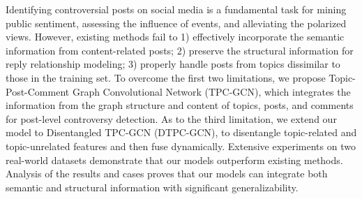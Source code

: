 Identifying controversial posts on social media is a fundamental task for mining public sentiment, assessing the influence of events, and alleviating the polarized views. However, existing methods fail to 1) effectively incorporate the semantic information from content-related posts; 2) preserve the structural information for reply relationship modeling; 3) properly handle posts from topics dissimilar to those in the training set. To overcome the first two limitations, we propose Topic-Post-Comment Graph Convolutional Network (TPC-GCN), which integrates the information from the graph structure and content of topics, posts, and comments for post-level controversy detection. As to the third limitation, we extend our model to Disentangled TPC-GCN (DTPC-GCN), to disentangle topic-related and topic-unrelated features and then fuse dynamically. Extensive experiments on two real-world datasets demonstrate that our models outperform existing methods. Analysis of the results and cases proves that our models can integrate both semantic and structural information with significant generalizability.
